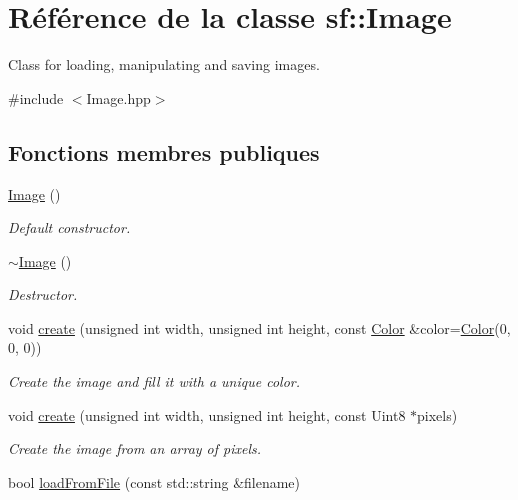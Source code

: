 \hypertarget{classsf_1_1Image}{}\section{Référence de la classe sf\+:\+:Image}
\label{classsf_1_1Image}


Class for loading, manipulating and saving images.  




{\ttfamily \#include $<$Image.\+hpp$>$}

\subsection*{Fonctions membres publiques}
\begin{DoxyCompactItemize}
\item 
\hyperlink{classsf_1_1Image_abb4caf3cb167b613345ebe36fc883f12}{Image} ()
\begin{DoxyCompactList}\small\item\em Default constructor. \end{DoxyCompactList}\item 
\mbox{\label{classsf_1_1Image_a0ba22a38e6c96e3b37dd88198046de83}} 
\hyperlink{classsf_1_1Image_a0ba22a38e6c96e3b37dd88198046de83}{$\sim$\+Image} ()
\begin{DoxyCompactList}\small\item\em Destructor. \end{DoxyCompactList}\item 
void \hyperlink{classsf_1_1Image_a2a67930e2fd9ad97cf004e918cf5832b}{create} (unsigned int width, unsigned int height, const \hyperlink{classsf_1_1Color}{Color} \&color=\hyperlink{classsf_1_1Color}{Color}(0, 0, 0))
\begin{DoxyCompactList}\small\item\em Create the image and fill it with a unique color. \end{DoxyCompactList}\item 
void \hyperlink{classsf_1_1Image_a1c2b960ea12bdbb29e80934ce5268ebf}{create} (unsigned int width, unsigned int height, const Uint8 $\ast$pixels)
\begin{DoxyCompactList}\small\item\em Create the image from an array of pixels. \end{DoxyCompactList}\item 
bool \hyperlink{classsf_1_1Image_a9e4f2aa8e36d0cabde5ed5a4ef80290b}{load\+From\+File} (const std\+::string \&filename)

\end{DoxyCompactItemize}
